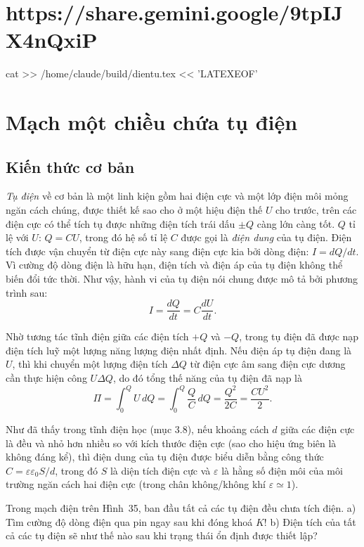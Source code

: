 \section{https://share.gemini.google/9tpIJX4nQxiP}

cat >> /home/claude/build/dientu.tex << 'LATEXEOF'
\section{Mạch một chiều chứa tụ điện}

\subsection{Kiến thức cơ bản}

\emph{Tụ điện} về cơ bản là một linh kiện gồm hai điện cực và một lớp điện môi mỏng ngăn cách chúng, được thiết kế sao cho ở một hiệu điện thế $U$ cho trước, trên các điện cực có thể tích tụ được những điện tích trái dấu $\pm Q$ càng lớn càng tốt. $Q$ tỉ lệ với $U$: $Q = CU$, trong đó hệ số tỉ lệ $C$ được gọi là \emph{điện dung} của tụ điện. Điện tích được vận chuyển từ điện cực này sang điện cực kia bởi dòng điện: $I = dQ/dt$. Vì cường độ dòng điện là hữu hạn, điện tích và điện áp của tụ điện không thể biến đổi tức thời. Như vậy, hành vi của tụ điện nói chung được mô tả bởi phương trình sau:
\[
I = \frac{dQ}{dt} = C\frac{dU}{dt}. \tag{1}
\]

Nhờ tương tác tĩnh điện giữa các điện tích $+Q$ và $-Q$, trong tụ điện đã được nạp điện tích luỹ một lượng năng lượng điện nhất định. Nếu điện áp tụ điện đang là $U$, thì khi chuyển một lượng điện tích $\Delta Q$ từ điện cực âm sang điện cực dương cần thực hiện công $U\Delta Q$, do đó tổng thế năng của tụ điện đã nạp là
\[
\Pi = \int_0^Q U\,dQ = \int_0^Q \frac{Q}{C}\,dQ = \frac{Q^2}{2C} = \frac{CU^2}{2}.
\]

Như đã thấy trong tĩnh điện học (mục 3.8), nếu khoảng cách $d$ giữa các điện cực là đều và nhỏ hơn nhiều so với kích thước điện cực (sao cho hiệu ứng biên là không đáng kể), thì điện dung của tụ điện được biểu diễn bằng công thức $C = \varepsilon\varepsilon_0 S/d$, trong đó $S$ là diện tích điện cực và $\varepsilon$ là hằng số điện môi của môi trường ngăn cách hai điện cực (trong chân không/không khí $\varepsilon \simeq 1$).

 Trong mạch điện trên Hình~35, ban đầu tất cả các tụ điện đều chưa tích điện. a) Tìm cường độ dòng điện qua pin ngay sau khi đóng khoá $K$! b) Điện tích của tất cả các tụ điện sẽ như thế nào sau khi trạng thái ổn định được thiết lập?

